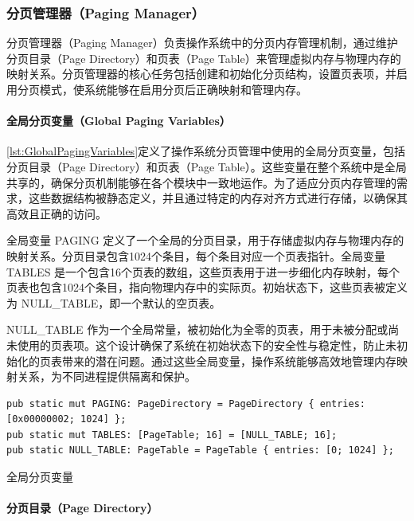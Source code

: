 \subsubsection{分页管理器（Paging Manager）}

分页管理器（Paging Manager）负责操作系统中的分页内存管理机制，通过维护分页目录（Page Directory）和页表（Page Table）来管理虚拟内存与物理内存的映射关系。分页管理器的核心任务包括创建和初始化分页结构，设置页表项，并启用分页模式，使系统能够在启用分页后正确映射和管理内存。

\paragraph{全局分页变量（Global Paging Variables）}

\cref{lst:GlobalPagingVariables}定义了操作系统分页管理中使用的全局分页变量，包括分页目录（Page Directory）和页表（Page Table）。这些变量在整个系统中是全局共享的，确保分页机制能够在各个模块中一致地运作。为了适应分页内存管理的需求，这些数据结构被静态定义，并且通过特定的内存对齐方式进行存储，以确保其高效且正确的访问。

全局变量 PAGING 定义了一个全局的分页目录，用于存储虚拟内存与物理内存的映射关系。分页目录包含1024个条目，每个条目对应一个页表指针。全局变量 TABLES 是一个包含16个页表的数组，这些页表用于进一步细化内存映射，每个页表也包含1024个条目，指向物理内存中的实际页。初始状态下，这些页表被定义为 NULL\_TABLE，即一个默认的空页表。

NULL\_TABLE 作为一个全局常量，被初始化为全零的页表，用于未被分配或尚未使用的页表项。这个设计确保了系统在初始状态下的安全性与稳定性，防止未初始化的页表带来的潜在问题。通过这些全局变量，操作系统能够高效地管理内存映射关系，为不同进程提供隔离和保护。

\begin{listing}[htbp]
    \begin{verbatim}
pub static mut PAGING: PageDirectory = PageDirectory { entries: [0x00000002; 1024] };
pub static mut TABLES: [PageTable; 16] = [NULL_TABLE; 16];
pub static NULL_TABLE: PageTable = PageTable { entries: [0; 1024] };
    \end{verbatim}
    \caption{全局分页变量}\label{lst:GlobalPagingVariables}
\end{listing}

\paragraph{分页目录（Page Directory）}

